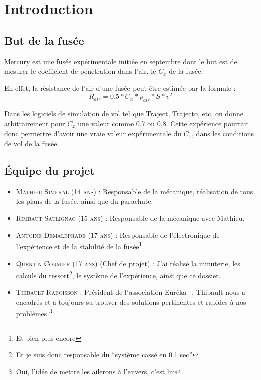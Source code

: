 \documentclass[a4paper,12pt]{scrartcl}
\begin{document}
	
    \newpage
    \tableofcontents
    \newpage
	  \section{Introduction}
	      \subsection{But de la fusée}
		Mercury est une fusée expérimentale initiée en septembre dont le but est de mesurer le coefficient de pénétration dans l'air, 
		le $C_x$ de la fusée.

		En effet, la résistance de l'air d'une fusée peut être estimée par la formule : 
		$$ R_{air} = 0.5 * C_x * \rho_{air} * S * v^2$$

		Dans les logiciels de simulation de vol tel que Traject, Trajecto, etc, on donne arbitrairement pour $C_x$ une valeur comme 0,7 ou 0,8.
		Cette expérience pourrait donc permettre d'avoir une vraie valeur expérimentale du $C_x$, dans les conditions de vol de la fusée.

	      \subsection{Équipe du projet}
		 \begin{itemize}
		  \item \textsc{Mathieu Simeral (14 ans)} : Responsable de la mécanique, réalisation de tous les plans de la fusée, ainsi que du parachute.
		  \item \textsc{Rimbaut Saulignac (15 ans)} : Responsable de la mécanique avec Mathieu.
		  \item \textsc{Antoine Demaleprade (17 ans)} : Responsable de l'électronique de l'expérience et de la stabilité de la fusée\footnote{Et bien plus encore}.
		  \item \textsc{Quentin Cormier (17 ans)} (Chef de projet) : J'ai réalisé la minuterie, les calculs du ressort\footnote{Et je suis donc responsable du ``système cassé en 0.1 sec''}, le système de l'expérience, ainsi que ce dossier.
		  \item \textsc{Thibault Raboisson} : Président de l'association Eurêka+, Thibault nous a encadrés et a toujours su trouver des solutions pertinentes et rapides à nos problèmes \footnote{Oui, l'idée de mettre les ailerons à l'envers, c'est lui}
		 \end{itemize}
\end{document}
